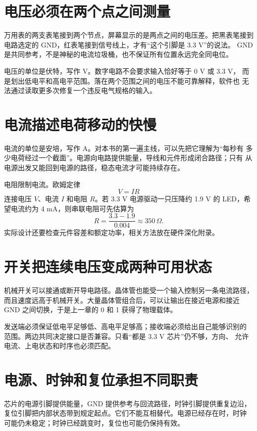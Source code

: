\section{电压必须在两个点之间测量}

万用表的两支表笔接到两个节点，屏幕显示的是两点之间的电压差。把黑表笔接到
电路选定的 GND，红表笔接到信号线上，才有“这个引脚是 3.3 V”的说法。
GND 是共同参考，不是神秘的电流垃圾桶，也不保证所有位置永远完全同电位。

电压的单位是伏特，写作 V。数字电路不会要求输入恰好等于 0 V 或 3.3 V，
而是划出低电平和高电平范围。落在两个范围之间的电压不能可靠解释，软件也
无法通过读取更多次修复一个违反电气规格的输入。

\section{电流描述电荷移动的快慢}

电流的单位是安培，写作 A。对本书的第一遍主线，可以先把它理解为“每秒有
多少电荷经过一个截面”。电源向电路提供能量，导线和元件形成闭合路径；只有
从电源出发又能回到电源的路径，稳态电流才可能持续存在。

电阻限制电流。欧姆定律
\[
  V=IR
\]
连接电压 \(V\)、电流 \(I\) 和电阻 \(R\)。若 3.3 V 电源驱动一只压降约
1.9 V 的 LED，希望电流约为 4 mA，则串联电阻可先估算为
\[
  R=\frac{3.3-1.9}{0.004}\approx350\,\Omega.
\]
实际设计还要检查元件容差和额定功率，相关方法放在硬件深化附录。

\section{开关把连续电压变成两种可用状态}

机械开关可以接通或断开导电路径。晶体管也能受一个输入控制另一条电流路径，
而且速度远高于机械开关。大量晶体管组合后，可以让输出在接近电源和接近 GND
之间切换，于是上一章的 0 和 1 获得了物理载体。

发送端必须保证低电平足够低、高电平足够高；接收端必须给出自己能够识别的
范围。两边共同决定接口是否兼容。只看“都是 3.3 V 芯片”仍不够，方向、
允许电流、上电状态和时序也必须匹配。

\section{电源、时钟和复位承担不同职责}

芯片的电源引脚提供能量，GND 提供参考与回流路径，时钟引脚提供重复边沿，
复位引脚把内部状态带到规定起点。它们不能互相替代。电源已经存在时，时钟
可能仍未稳定；时钟已经跳变时，复位也可能仍保持有效。

